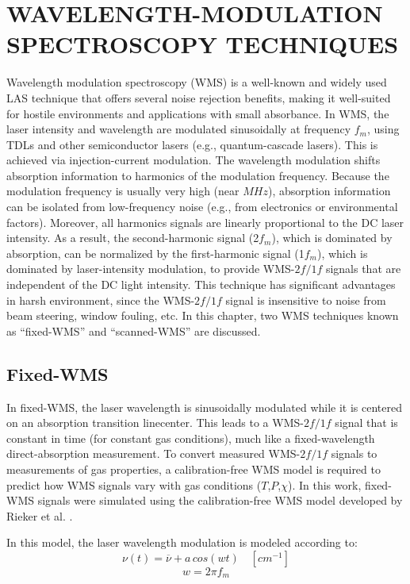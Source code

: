 \chapter{WAVELENGTH-MODULATION SPECTROSCOPY TECHNIQUES}

Wavelength modulation spectroscopy (WMS) is a well-known and widely used LAS technique that offers several noise rejection benefits, making it well-suited for hostile environments and applications with small absorbance. In WMS, the laser intensity and wavelength are modulated sinusoidally at frequency $f_m$, using TDLs and other semiconductor lasers (e.g., quantum-cascade lasers). This is achieved via injection-current modulation. The wavelength modulation shifts absorption information to harmonics of the modulation frequency. Because the modulation frequency is usually very high (near $MHz$), absorption information can be isolated from low-frequency noise (e.g., from electronics or environmental factors). Moreover, all harmonics signals are linearly proportional to the DC laser intensity. As a result, the second-harmonic signal (2$f_m$), which is dominated by absorption, can be normalized by the first-harmonic signal (1$f_m$), which is dominated by laser-intensity modulation, to provide WMS-$2f/1f$ signals that are independent of the DC light intensity. This technique has significant advantages in harsh environment, since the WMS-$2f/1f$ signal is insensitive to noise from beam steering, window fouling, etc.  In this chapter, two WMS techniques known as 	``fixed-WMS'' and ``scanned-WMS'' are discussed.



 \section{Fixed-WMS}
In fixed-WMS, the laser wavelength is sinusoidally modulated while it is centered on an absorption transition linecenter. This leads to a WMS-$2f/1f$ signal that is constant in time (for constant gas conditions), much like a fixed-wavelength direct-absorption measurement. To convert measured WMS-$2f/1f$ signals to measurements of gas properties, a calibration-free WMS model is required to predict how WMS signals vary with gas conditions ($T$,$P$,$\chi$). In this work, fixed-WMS signals were simulated using the calibration-free WMS model developed by Rieker et al. \cite{rieker2009calibration}. 

In this model, the laser wavelength modulation is modeled according to:
\begin{equation}
\nu(t)=\overline{\nu}+a\,cos(wt) \quad [cm^{-1}]
\end{equation}
\begin{equation}
w=2\pi f_m
\end{equation}

